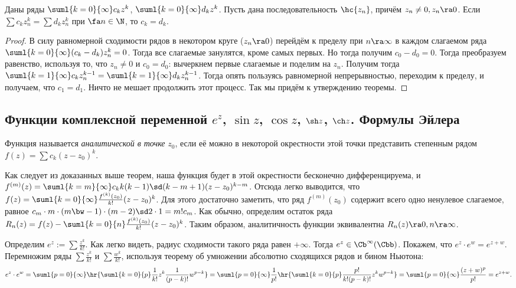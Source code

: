 \documentclass[a4paper]{article}
\begin{document}
\begin{theorem}[О единственности]
Даны ряды $\suml{k=0}{\infty} c_kz^k$, $\suml{k=0}{\infty}d_kz^k$. Пусть дана последовательность $\hc{z_n}$, причём
$z_n \neq 0, z_n \ra 0$. Если $\sum c_kz^k_n= \sum d_kz^k_n$ при $\fa n \in \N$, то $c_k=d_k$.
\end{theorem}
\begin{proof}
В силу равномерной сходимости рядов в некотором круге ($z_n \ra 0$) перейдём к пределу при
$n \ra \infty$ в каждом слагаемом ряда $\suml{k=0}{\infty} (c_k-d_k)z^k_n = 0$. Тогда
все слагаемые занулятся, кроме самых первых. Но тогда получим $c_0-d_0=0$. Тогда преобразуем
равенство, используя то, что $z_n \neq 0$ и $c_0=d_0$: вычеркнем первые слагаемые и поделим
на $z_n$. Получим тогда $\suml{k=1}{\infty} c_kz^{k-1}_n=\suml{k=1}{\infty} d_kz^{k-1}_n$. Тогда
опять пользуясь равномерной непрерывностью, переходим к пределу, и получаем, что $c_1=d_1$.
Ничто не мешает продолжить этот процесс. Так мы придём к утверждению теоремы.
\end{proof}

\subsection{Функции комплексной переменной $e^z$, $\sin z$, $\cos z$, $\sh z$, $\ch z$. Формулы Эйлера}

\begin{df}
Функция называется \emph{аналитической в точке} $z_0$, если её можно в некоторой
окрестности этой точки представить степенным рядом $f(z) = \sum c_k(z-z_0)^k$.
\end{df}

Как следует из доказанных выше теорем, наша функция будет в этой окрестности бесконечно дифференцируема, и
$f^{(m)}(z)=\suml{k=m}{\infty}c_kk(k-1)\sd (k-m+1)(z-z_0)^{k-m}$. Отсюда легко выводится, что
$f(z) =\suml{k=0}{\infty} \frac{f^{(k)}(z_0)}{k!}(z-z_0)^k$. Для этого достаточно заметить,
что ряд $f^{(m)}(z_0)$ содержит всего одно ненулевое слагаемое, равное
$c_m\cdot m\cdot (m\bw-1)\cdot(m-2)\sd 2\cdot 1= m!c_m$. Как обычно,
определим остаток ряда $R_n(z)= f(z)-\suml{k=0}{n}\frac{f^{(k)}(z_0)}{k!}(z-z_0)^k$. Таким
образом, аналитичность функции эквивалентна $R_n(z) \ra 0, n \ra \infty$.

Определим $e^z := \sum \frac{z^k}{k!}$. Как легко видеть, радиус сходимости такого ряда равен
$+\infty$. Тогда $e^z \in \Cb^\infty(\Cbb)$.
Покажем, что $e^z \cdot e^w = e^{z+w}$. Перемножим ряды $\sum \frac{z^k}{k!}$ и $\sum \frac{w^k}{k!}$,
используя теорему об умножении абсолютно сходящихся рядов и бином Ньютона:
$$e^z \cdot e^w=\suml{p=0}{\infty}\hr{ \suml{k=0}{p}\frac{1}{k!}z^k \frac{1}{(p-k)!}w^{p-k}} =
\suml{p=0}{\infty}\frac{1}{p!}\hr{ \suml{k=0}{p}\frac{p!}{k!(p-k)!}z^kw^{p-k}} =
\suml{p=0}{\infty}\frac{(z+w)^p}{p!}=e^{z+w}.$$
\end{document}

